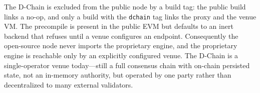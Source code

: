 The D-Chain is excluded from the public node by a build tag: the public build links a
no-op, and only a build with the \texttt{dchain} tag links the proxy and the venue VM.
The precompile is present in the public EVM but defaults to an inert backend that refuses
until a venue configures an endpoint. Consequently the open-source node never imports the
proprietary engine, and the proprietary engine is reachable only by an explicitly
configured venue. The D-Chain is a single-operator venue today---still a full consensus
chain with on-chain persisted state, not an in-memory authority, but operated by one
party rather than decentralized to many external validators.
